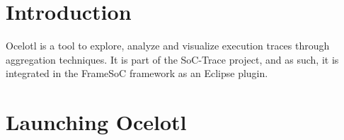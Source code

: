 \documentclass[twoside]{article}
\begin{document}
\begin{sloppypar} %


\newcommand{\parag}[1]{\paragraph{#1}\mbox{}\\}
\newcommand{\subparag}[1]{\subparagraph{#1}\mbox{}\\}
\newcommand{\subsubparag}[1]{\subparagraph{#1}}
\renewcommand{\labelitemi}{$\bullet$}
\renewcommand{\labelitemii}{$\circ$}

\makeRT 

\renewcommand{\contentsname}{Table of contents}
\tableofcontents
\newpage
\section{Introduction}
\label{intro}


Ocelotl is a tool to explore, analyze and visualize execution traces through aggregation techniques. It is part of the SoC-Trace project, and as such, it is integrated in the FrameSoC framework as an Eclipse plugin. 



\section{Launching Ocelotl}


\end{sloppypar}
\end{document}
